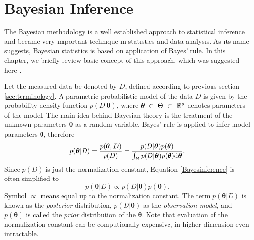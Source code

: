 \section{Bayesian Inference}
The Bayesian methodology is a well established approach to statistical inference and became very important technique in statistics and data analysis. As its name suggests, Bayesian statistics is based on application of Bayes' rule. In this chapter, we briefly review basic concept of this approach, which was suggested here \cite{smidl}. 

 Let the measured data be denoted by $D$, defined according to previous section \ref{sec:terminology}. A parametric probabilistic model of the data $D$ is given by the probability density function  $p\left(D|\boldsymbol{\theta}\right)$, where $\boldsymbol{\theta}~\in~\Theta~\subset~\mathbb{R}^s$ denotes parameters of the model. The main idea behind Bayesian theory is the treatment of the unknown parameters $\boldsymbol{\theta}$ as a random variable.  Bayes' rule is applied to infer model parameters $\boldsymbol{\theta}$, therefore
 \begin{equation}\label{Bayesinference}
 	p(\boldsymbol{\theta} | D) = \frac{p(\boldsymbol{\theta}, D)}{p(D)} = \frac{p(D| \boldsymbol{\theta})p(\boldsymbol{\theta})}{\int_{\Theta}p(D|\boldsymbol{\theta})p(\boldsymbol{\theta})\mathrm{d}\boldsymbol{\theta}}.
 \end{equation} 
Since $p(D)$ is just the normalization constant, Equation \eqref{Bayesinference} is often simplified to
\begin{equation}
	p(\boldsymbol{\theta} | D) \propto p(D| \boldsymbol{\theta})p(\boldsymbol{\theta}).
\end{equation} 
Symbol $\propto$ means equal up to the normalization constant. The term $p(\boldsymbol{\theta} | D)$ is known as the \emph{posterior} distribution, $p(D| \boldsymbol{\theta})$  as the \emph{observation model}, and $p(\boldsymbol{\theta})$ is called the \emph{prior} distribution of the $\boldsymbol{\theta}$. Note that evaluation of the normalization constant can be computionally expensive, in higher dimension even intractable. 

